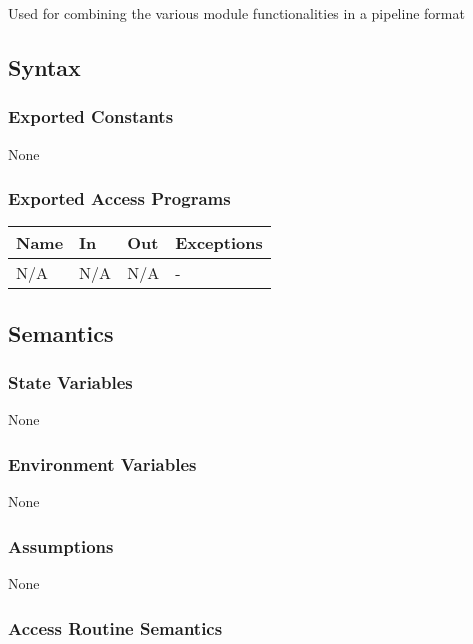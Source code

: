 \documentclass[12pt, titlepage]{article}
\begin{document}
Used for combining the various module functionalities in a pipeline format

\subsection{Syntax}

\subsubsection{Exported Constants}

None 


\subsubsection{Exported Access Programs}

\begin{center}
\begin{tabular}{p{3.5cm} p{4.5cm} p{3cm} p{2cm}}
\hline
\textbf{Name} & \textbf{In} & \textbf{Out} & \textbf{Exceptions} \\
\hline
N/A & N/A & N/A & - \\
\hline
\end{tabular}
\end{center}

\subsection{Semantics}

\subsubsection{State Variables}

None

\subsubsection{Environment Variables}

None

\subsubsection{Assumptions}

None


\subsubsection{Access Routine Semantics}
\end{document}
